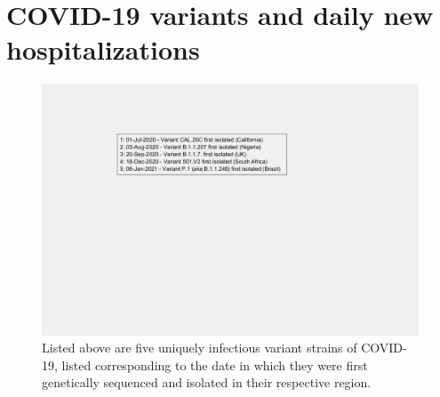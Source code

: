 \documentclass[]{article}
\begin{document}
 
\FloatBarrier
\vspace{5mm}
\section*{COVID-19 variants and daily new hospitalizations}

\begin{figure}[!h]
	\includegraphics[width=\linewidth]{legends/variant_strains_legend.png}
	\caption{Listed above are five uniquely infectious variant strains of COVID-19,  listed corresponding to the date in which they were first genetically sequenced and isolated in their respective region.}
	\label{fig:legends/variant_strains_legendLabel}
\end{figure}
\end{document}

